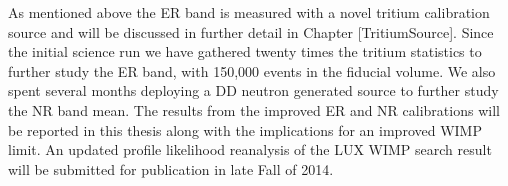 \newpage

As mentioned above the ER band is measured with a novel tritium calibration source and will be discussed in further detail in Chapter [TritiumSource]. Since the initial science run we have gathered twenty times the tritium statistics to further study the ER band, with 150,000 events in the fiducial volume. We also spent several months deploying a DD neutron generated source to further study the NR band mean. The results from the improved ER and NR calibrations will be reported in this thesis along with the implications for an improved WIMP limit. An updated profile likelihood reanalysis of the LUX WIMP search result will be submitted for publication in late Fall of 2014. 
